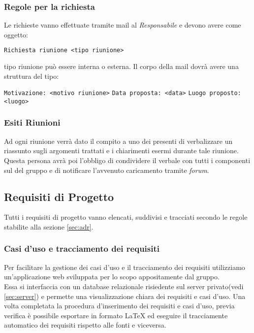 \documentclass{scalatekids-article}
\begin{document}
\subsubsection{Regole per la richiesta}
Le richieste vanno effettuate tramite mail al \textit{Responsabile} e devono avere come oggetto:
\begin{center}
  \verb=Richiesta riunione <tipo riunione>=
\end{center}
tipo riunione può essere interna o esterna.
Il corpo della mail dovrà avere una struttura del tipo:
\begin{center}
  \verb=Motivazione: <motivo riunione>=
  \verb=Data proposta: <data>=
  \verb=Luogo proposto: <luogo>=
\end{center}

\subsubsection{Esiti Riunioni}
Ad ogni riunione verrà dato il compito a uno dei presenti di verbalizzare un riassunto sugli argomenti trattati e i chiarimenti esermi durante tale riunione.\\
Questa persona avrà poi l'obbligo di condividere il verbale con tutti i componenti sul \textit{} del gruppo e di notificare l'avvenuto caricamento tramite \textit{forum}.

\subsection{Requisiti di Progetto}
Tutti i requisiti di progetto vanno elencati, suddivisi e tracciati secondo le regole stabilite alla sezione \ref{sec:adr}.
\subsubsection{Casi d'uso e tracciamento dei requisiti}
\label{sec:frontend}
Per facilitare la gestione dei casi d'uso e il tracciamento dei requisiti
utilizziamo un'applicazione web sviluppata per lo scopo appositamente dal
gruppo.\\Essa si interfaccia con un database relazionale risiedente sul server
privato(vedi \ref{sec:server}) e permette una visualizzazione chiara dei
requisiti e casi d'uso. Una volta completata la procedura d'inserimento dei
requisiti e casi d'uso, previa verifica è possibile esportare in formato
\LaTeX\xspace ed eseguire il tracciamente automatico dei requisiti rispetto alle
fonti e viceversa.
\end{document}
